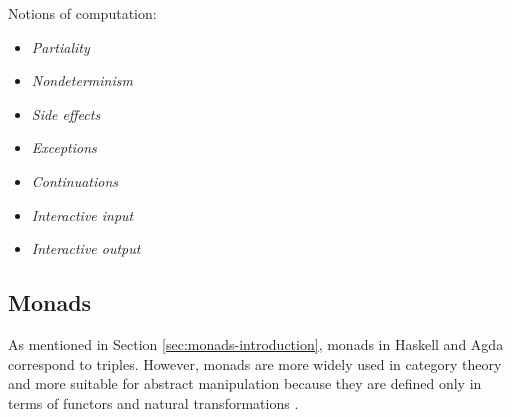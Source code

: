 \begin{examples}
  \label{ex:notions-computation}

  Notions of computation:
  \begin{itemize}
  \item
    \emph{Partiality}
  \item
    \emph{Nondeterminism} 
  \item
    \emph{Side effects}
  \item
    \emph{Exceptions}
  \item
    \emph{Continuations}
  \item
    \emph{Interactive input}
  \item
    \emph{Interactive output}
  \end{itemize}
\end{examples}

\subsection*{Monads}


As mentioned in Section \ref{sec:monads-introduction}, monads in
Haskell and Agda correspond to triples. However, monads are more
widely used in category theory and more suitable for abstract
manipulation because they are defined only in terms of functors and
natural transformations \parencite[60]{moggi-1991}.


